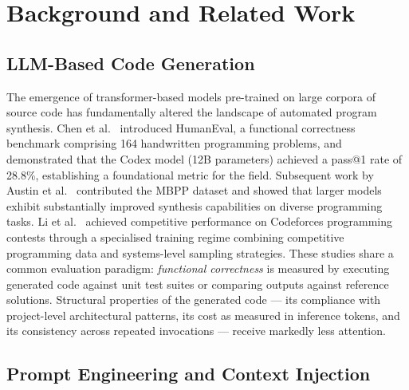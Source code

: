 \documentclass[review,12pt,3p]{elsarticle}
\begin{document}
\section{Background and Related Work}
\label{sec:background}

\subsection{LLM-Based Code Generation}

The emergence of transformer-based models pre-trained on large corpora of source code has
fundamentally altered the landscape of automated program synthesis. Chen et
al.~\citep{Chen2021HumanEval} introduced HumanEval, a functional correctness benchmark
comprising 164 handwritten programming problems, and demonstrated that the Codex model
(12B parameters) achieved a pass@1 rate of 28.8\%, establishing a foundational metric for
the field. Subsequent work by Austin et al.~\citep{Austin2021MBPP} contributed the MBPP
dataset and showed that larger models exhibit substantially improved synthesis capabilities
on diverse programming tasks. Li et al.~\citep{Li2022AlphaCode} achieved competitive
performance on Codeforces programming contests through a specialised training regime
combining competitive programming data and systems-level sampling strategies. These studies
share a common evaluation paradigm: \emph{functional correctness} is measured by executing
generated code against unit test suites or comparing outputs against reference solutions.
Structural properties of the generated code --- its compliance with project-level
architectural patterns, its cost as measured in inference tokens, and its consistency across
repeated invocations --- receive markedly less attention.

\subsection{Prompt Engineering and Context Injection}
\end{document}
